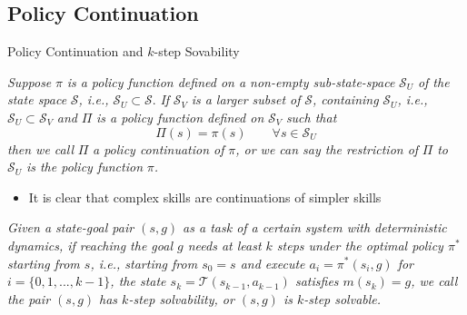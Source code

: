 \documentclass[10pt,hyperref={CJKbookmarks=true},envcountsect,mathserif]{beamer}
\begin{document}
\subsection{Policy Continuation}
\begin{frame}{Policy Continuation and $k$-step Sovability}
\begin{definition}%
	\textit{Suppose} $\pi$ \textit{is a policy function defined on a non-empty sub-state-space} $\mathcal{S}_{U}$ \textit{of the state space} $\mathcal{S}$\textit{, i.e.,} $\mathcal{S}_{U}\subset\mathcal{S}$. \textit{If} $\mathcal{S}_{V}$ \textit{is a larger subset of} $\mathcal{S}$\textit{, containing} $\mathcal{S}_{U}$\textit{, i.e.,} $\mathcal{S}_{U}\subset\mathcal{S}_{V}$ \textit{and} $\Pi$ \textit{is a policy function defined on} $\mathcal{S}_{V}$ \textit{such that}
	$$\Pi(s) = \pi(s)\qquad \forall s\in\mathcal{S}_U $$
	\textit{then we call} $\Pi$ \textit{a policy continuation of} $\pi$\textit{, or we can say the restriction of} $\Pi$ \textit{to} $\mathcal{S}_{U}$ \textit{is the policy function} $\pi$\textit{.}
\end{definition}
\begin{itemize}
\item It is clear that complex skills are continuations of simpler skills
\end{itemize}

\begin{definition}
	\textit{Given a state-goal pair $(s,g)$ as a task of a certain system with deterministic dynamics, if reaching the goal $g$ needs at least $k$ steps under the optimal policy $\pi^*$ starting from $s$, i.e., starting from $s_0 = s$ and execute $a_i = \pi^*(s_i,g)$ for $i=\{0,1,...,k-1\}$, the state $s_{k} = \mathcal{T}(s_{k-1},a_{k-1})$ satisfies $m(s_k) = g$, we call the pair $(s,g)$ has $k$-step solvability, or $(s,g)$ is $k$-step solvable.}
	\end{definition}
	
	
\end{frame}
\end{document}
